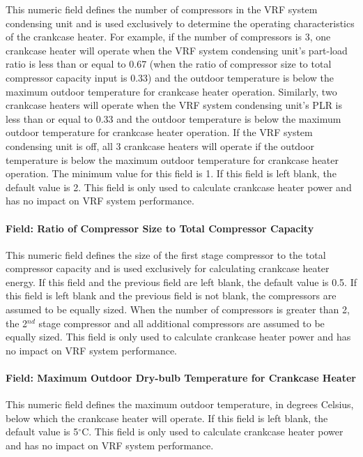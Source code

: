 This numeric field defines the number of compressors in the VRF system condensing unit and is used exclusively to determine the operating characteristics of the crankcase heater. For example, if the number of compressors is 3, one crankcase heater will operate when the VRF system condensing unit's part-load ratio is less than or equal to 0.67 (when the ratio of compressor size to total compressor capacity input is 0.33) and the outdoor temperature is below the maximum outdoor temperature for crankcase heater operation. Similarly, two crankcase heaters will operate when the VRF system condensing unit's PLR is less than or equal to 0.33 and the outdoor temperature is below the maximum outdoor temperature for crankcase heater operation. If the VRF system condensing unit is off, all 3 crankcase heaters will operate if the outdoor temperature is below the maximum outdoor temperature for crankcase heater operation. The minimum value for this field is 1. If this field is left blank, the default value is 2. This field is only used to calculate crankcase heater power and has no impact on VRF system performance.

\paragraph{Field: Ratio of Compressor Size to Total Compressor Capacity}

This numeric field defines the size of the first stage compressor to the total compressor capacity and is used exclusively for calculating crankcase heater energy. If this field and the previous field are left blank, the default value is 0.5. If this field is left blank and the previous field is not blank, the compressors are assumed to be equally sized. When the number of compressors is greater than 2, the 2\(^{nd}\) stage compressor and all additional compressors are assumed to be equally sized. This field is only used to calculate crankcase heater power and has no impact on VRF system performance.

\paragraph{Field: Maximum Outdoor Dry-bulb Temperature for Crankcase Heater}

This numeric field defines the maximum outdoor temperature, in degrees Celsius, below which the crankcase heater will operate. If this field is left blank, the default value is 5$^\circ$C. This field is only used to calculate crankcase heater power and has no impact on VRF system performance.

